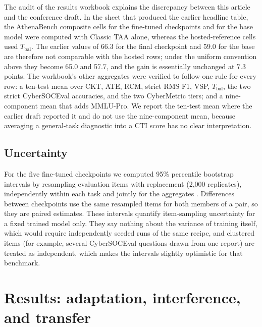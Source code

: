 \documentclass[preprint,12pt,authoryear]{elsarticle}
\newcommand{\Tbal}{T_{\mathrm{bal}}}
\begin{document}
The audit of the results workbook explains the discrepancy between this article and the conference draft. In the sheet that produced the earlier headline table, the AthenaBench composite cells for the fine-tuned checkpoints and for the base model were computed with Classic TAA alone, whereas the hosted-reference cells used $\Tbal$. The earlier values of 66.3 for the final checkpoint and 59.0 for the base are therefore not comparable with the hosted rows; under the uniform convention above they become 65.0 and 57.7, and the gain is essentially unchanged at 7.3 points. The workbook's other aggregates were verified to follow one rule for every row: a ten-test mean over CKT, ATE, RCM, strict RMS F1, VSP, $\Tbal$, the two strict CyberSOCEval accuracies, and the two CyberMetric tiers; and a nine-component mean that adds MMLU-Pro. We report the ten-test mean where the earlier draft reported it and do not use the nine-component mean, because averaging a general-task diagnostic into a CTI score has no clear interpretation.

\subsection{Uncertainty}\label{sec:uncertainty}
For the five fine-tuned checkpoints we computed 95\% percentile bootstrap intervals by resampling evaluation items with replacement (2,000 replicates), independently within each task and jointly for the aggregates \citep{efron1993bootstrap}. Differences between checkpoints use the same resampled items for both members of a pair, so they are paired estimates. These intervals quantify item-sampling uncertainty for a fixed trained model only. They say nothing about the variance of training itself, which would require independently seeded runs of the same recipe, and clustered items (for example, several CyberSOCEval questions drawn from one report) are treated as independent, which makes the intervals slightly optimistic for that benchmark.

\section{Results: adaptation, interference, and transfer}\label{sec:results}
\end{document}
